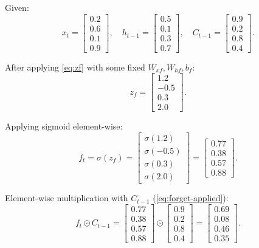 \documentclass[12pt,a4paper]{article}
\begin{document}
\begin{example}[title=Forget Gate -- 4-D Numerical Example (slide 42/75)]
Given:
\[
  x_t = \begin{bmatrix} 0.2 \\ 0.6 \\ 0.1 \\ 0.9 \end{bmatrix},\quad
  h_{t-1} = \begin{bmatrix} 0.5 \\ 0.1 \\ 0.3 \\ 0.7 \end{bmatrix},\quad
  C_{t-1} = \begin{bmatrix} 0.9 \\ 0.2 \\ 0.8 \\ 0.4 \end{bmatrix}.
\]

After applying \cref{eq:zf} with some fixed $W_{xf},W_{hf},b_f$:
\[
  z_f = \begin{bmatrix} 1.2 \\ -0.5 \\ 0.3 \\ 2.0 \end{bmatrix}.
\]

Applying sigmoid element-wise:
\[
  f_t = \sigma(z_f) = \begin{bmatrix}
    \sigma(1.2) \\ \sigma(-0.5) \\ \sigma(0.3) \\ \sigma(2.0)
  \end{bmatrix}
  = \begin{bmatrix} 0.77 \\ 0.38 \\ 0.57 \\ 0.88 \end{bmatrix}.
\]

Element-wise multiplication with $C_{t-1}$ (\cref{eq:forget-applied}):
\[
  f_t \odot C_{t-1}
  = \begin{bmatrix} 0.77 \\ 0.38 \\ 0.57 \\ 0.88 \end{bmatrix}
  \odot
  \begin{bmatrix} 0.9 \\ 0.2 \\ 0.8 \\ 0.4 \end{bmatrix}
  = \begin{bmatrix} 0.69 \\ 0.08 \\ 0.46 \\ 0.35 \end{bmatrix}.
\]


\end{example}
\end{document}

